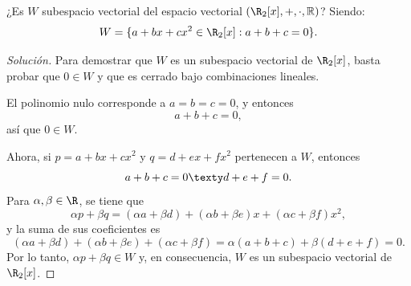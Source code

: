 \documentclass[a4,11pt]{aleph-notas}
\begin{document}
\begin{ejer}
    ¿Es $W$ subespacio vectorial del espacio vectorial $(\R_2[x], + , \cdot, \mathbb{R})$? Siendo:
    \[
    W = \{a+bx+cx^2\in\R_2[x]: a+b+c=0\}.
    \]
\end{ejer}

\begin{proof}[Solución]\hspace{0pt}
    Para demostrar que $W$ es un subespacio vectorial de $\R_2[x]$, basta probar que $0\in W$ y que es cerrado bajo combinaciones lineales.

    El polinomio nulo corresponde a $a=b=c=0$, y entonces
    \[
        a+b+c=0,
    \]
    así que $0\in W$.

    Ahora, si $p=a+bx+cx^2$ y $q=d+ex+fx^2$ pertenecen a $W$, entonces
    \[
        a+b+c=0
        \texty
        d+e+f=0.
    \]
    Para $\alpha,\beta\in\R$, se tiene que
    \[
        \alpha p+\beta q=(\alpha a+\beta d)+(\alpha b+\beta e)x+(\alpha c+\beta f)x^2,
    \]
    y la suma de sus coeficientes es
    \[
        (\alpha a+\beta d)+(\alpha b+\beta e)+(\alpha c+\beta f)
        =\alpha(a+b+c)+\beta(d+e+f)=0.
    \]
    Por lo tanto, $\alpha p+\beta q\in W$ y, en consecuencia, $W$ es un subespacio vectorial de $\R_2[x]$.
\end{proof}
\end{document}
